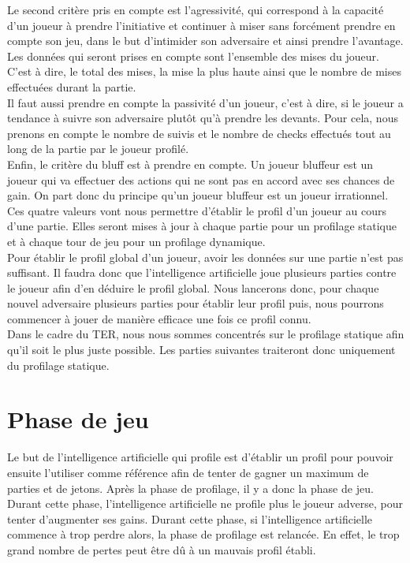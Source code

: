\documentclass{report}
\begin{document}
Le second critère pris en compte est l'agressivité, qui correspond à la capacité d'un joueur à prendre l'initiative et continuer à miser sans forcément prendre en compte son jeu, dans le but d'intimider son adversaire et ainsi prendre l'avantage. Les données qui seront prises en compte sont l'ensemble des mises du joueur. C'est à dire, le total des mises, la mise la plus haute ainsi que le nombre de mises effectuées durant la partie. \\

Il faut aussi prendre en compte la passivité d'un joueur, c'est à dire, si le joueur a tendance à suivre son adversaire plutôt qu'à prendre les devants. Pour cela, nous prenons en compte le nombre de suivis et le nombre de checks effectués tout au long de la partie par le joueur profilé.\\

Enfin, le critère du bluff est à prendre en compte. Un joueur bluffeur est un joueur qui va effectuer des actions qui ne sont pas en accord avec ses chances de gain. On part donc du principe qu'un joueur bluffeur est un joueur irrationnel.\\

Ces quatre valeurs vont nous permettre d'établir le profil d'un joueur au cours d'une partie. Elles seront mises à jour à chaque partie pour un profilage statique et à chaque tour de jeu pour un profilage dynamique. \\

Pour établir le profil global d'un joueur, avoir les données sur une partie n'est pas suffisant. Il faudra donc que l'intelligence artificielle joue plusieurs parties contre le joueur afin d'en déduire le profil global. Nous lancerons donc, pour chaque nouvel adversaire plusieurs parties pour établir leur profil puis, nous pourrons commencer à jouer de manière efficace une fois ce profil connu.\\

Dans le cadre du TER, nous nous sommes concentrés sur le profilage statique afin qu'il soit le plus juste possible. Les parties suivantes traiteront donc uniquement du profilage statique. \par


\section{Phase de jeu}

\hspace{0.5cm}Le but de l'intelligence artificielle qui profile est d'établir un profil pour pouvoir ensuite l'utiliser comme référence afin de tenter de gagner un maximum de parties et de jetons. Après la phase de profilage, il y a donc la phase de jeu. Durant cette phase, l'intelligence artificielle ne profile plus le joueur adverse, pour tenter d'augmenter ses gains. Durant cette phase, si l'intelligence artificielle commence à trop perdre alors, la phase de profilage est relancée. En effet, le trop grand nombre de pertes peut être dû à un mauvais profil établi. \\
\end{document}
